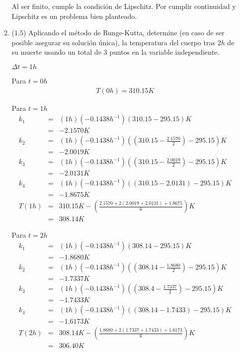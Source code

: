 \documentclass[12pt]{article}
\begin{document}
\begin{enumerate}[leftmargin=*,widest=9]
\begin{enumerate}[label=\alph*]
    Al ser finito, cumple la condición de Lipschitz. Por cumplir continuidad y Lipschitz es un problema bien planteado.

    \item (\(1.5\)) Aplicando el método de Runge-Kutta, determine (en caso de ser posible asegurar su solución única), la temperatura del cuerpo tras \(2h\) de su muerte usando un total de 3 puntos en la variable independiente.



    $\Delta t = 1h$

    Para $ t =  0h$
    \begin{eqnarray*}
    T(0h) =  310.15K
	\end{eqnarray*}

    Para $ t = 1 h$
    \begin{eqnarray*}
    k_1 &=& (1h)(-0.1438 h^{-1})(310.15-295.15)K \\ &=& -2.1570K \\ k_2 &=& (1h)(-0.1438 h^{-1})\left(\left(310.15- \frac{2.1570}{2} \right) - 295.15 \right) K \\ &=& -2.0019K \\  k_3 &=& (1h)(-0.1438 h^{-1})\left(\left(310.15- \frac{2.0019}{2} \right) - 295.15 \right) K \\ &=& -2.0131K \\  k_4 &=& (1h)(-0.1438 h^{-1})((310.15- 2.0131)-295.15)K \\ &=& -1.8675K \\ T(1h) &=& 310.15 K - \left( \frac{2.1570 + 2(2.0019+2.0131)+1.8675}{6}\right)K \\ &=& 308.14K
    \end{eqnarray*}

    Para $t = 2h$
    \begin{eqnarray*}
    k_1 &=& (1h)(-0.1438 h^{-1})(308.14-295.15)K \\ &=& -1.8680K \\ k_2 &=& (1h)(-0.1438 h^{-1})\left(\left(308.14- \frac{1.8680}{2} \right) - 295.15 \right) K \\ &=& -1.7337K \\  k_3 &=& (1h)(-0.1438 h^{-1})\left(\left(308.4- \frac{1.7337}{2} \right) - 295.15 \right) K \\ &=& -1.7433K \\  k_4 &=& (1h)(-0.1438 h^{-1})((308.14- 1.7433)-295.15)K \\ &=& -1.6173K \\ T(2h) &=& 308.14 K - \left( \frac{1.8680 + 2(1.7337+1.7433)+1.6173}{6}\right)K \\ &=& 306.40K
    \end{eqnarray*}


\end{enumerate}
\end{enumerate}
\end{document}
